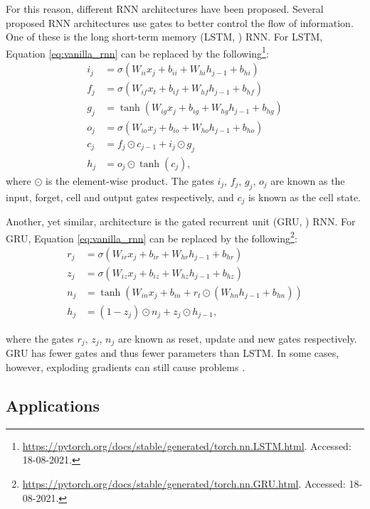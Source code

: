 For this reason, different RNN architectures have been proposed. Several proposed RNN architectures use gates to better control the flow of information. One of these is the long short-term memory (LSTM, \citealp{hochreiter1997long}) RNN. For LSTM, Equation \ref{eq:vanilla_rnn} can be replaced by the following\footnote{\url{https://pytorch.org/docs/stable/generated/torch.nn.LSTM.html}. Accessed: 18-08-2021.}: 
\begin{align}
    i_j &= \sigma(W_{ii}x_j + b_{ii} + W_{hi}h_{j-1} + b_{hi}) \\
    f_j &= \sigma(W_{if}x_t + b_{if} + W_{hf}h_{j-1} + b_{hf}) \\
    g_j &= \tanh(W_{ig}x_j + b_{ig} + W_{hg}h_{j-1} + b_{hg}) \\
    o_j &= \sigma(W_{io}x_j + b_{io} + W_{ho}h_{j-1} + b_{ho}) \\
    c_j &= f_j \odot c_{j-1} + i_j \odot g_j \\
    h_j &= o_j \odot \tanh(c_j),
\end{align}
where  $\odot$ is the element-wise product. The gates $i_j$, $f_j$, $g_j$, $o_j$ are known as the input, forget, cell and output gates respectively, and $c_j$ is known as the cell state. 

Another, yet similar, architecture is the gated recurrent unit (GRU, \citealp{cho2014learning}) RNN. For GRU, Equation \ref{eq:vanilla_rnn} can be replaced by the following\footnote{\url{https://pytorch.org/docs/stable/generated/torch.nn.GRU.html}. Accessed: 18-08-2021.}:
\begin{align}
    r_j &= \sigma(W_{ir}x_j + b_{ir} + W_{hr}h_{j-1} + b_{hr}) \\
    z_j &= \sigma(W_{iz}x_j + b_{iz} + W_{hz}h_{j-1} + b_{hz}) \\   
    n_j &= \tanh(W_{in}x_j + b_{in} + r_t \odot (W_{hn}h_{j-1} + b_{hn})) \\
    h_j &= (1 - z_j) \odot n_j + z_j \odot h_{j-1},
\end{align}

\noindent where the gates $r_j$, $z_j$, $n_j$ are known as reset, update and new gates respectively. GRU has fewer gates and thus fewer parameters than LSTM. In some cases, however, exploding gradients can still cause problems \citep{kanai2017preventing}. 

\subsection{Applications}

